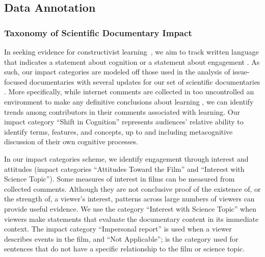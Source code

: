 \subsection{Data Annotation}

\subsubsection{Taxonomy of Scientific Documentary Impact}
In seeking evidence for constructivist learning~\citep[e.g.,][]{bada2015constructivism}, we aim to track written language that indicates a statement about cognition or a statement about engagement .
As such, our impact categories are modeled off those used in the analysis of issue-focused documentaries \citep{rezapour2017classification} with several updates for our set of scientific documentaries%
\citep[in Table 1,][]{rezapour2017classification}. %
More specifically, while internet comments are collected in too uncontrolled an environment to make any definitive conclusions about learning \citep[e.g.,][]{jensen_putting_2017}, we can identify trends among contributors in their comments associated with learning. Our impact category ``Shift in Cognition'' represents audiences' relative ability to identify terms, features, and concepts, up to and including metacognitive discussion of their own cognitive processes. %
    
In our impact categories scheme, we identify engagement through interest and attitudes (impact categories ``Attitudes Toward the Film'' and ``Interest with Science Topic''). Some measures of interest in films can be measured from collected comments. Although they are not conclusive proof of the existence of, or the strength of, a viewer's interest, patterns across large numbers of viewers can provide useful evidence. 
We use the category ``Interest with Science Topic'' when viewers make statements that evaluate the documentary content in its immediate context. 
The impact category ``Impersonal report'' is used when a viewer describes events in the film, and ``Not Applicable''; is the category used for sentences that do not have a specific relationship to the film or science topic.

